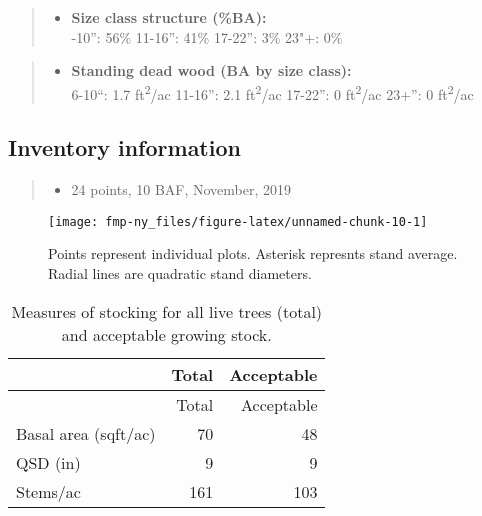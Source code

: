 \documentclass[]{tufte-handout}
\providecommand{\tightlist}{%
  \setlength{\itemsep}{0pt}\setlength{\parskip}{0pt}}
\begin{document}
\begin{quote}
\begin{itemize}
\tightlist
\item
  \textbf{Size class structure (\%BA):}\\
  \vspace{2pt} -10'': 56\% \textbar{} 11-16'': 41\% \textbar{}
  17-22'': 3\% \textbar{} 23"+: 0\%
\end{itemize}
\end{quote}

\begin{quote}
\begin{itemize}
\tightlist
\item
  \textbf{Standing dead wood (BA by size class):}\\
  \vspace{2pt} \indent \small 6-10``: 1.7 ft\textsuperscript{2}/ac
  \textbar{} 11-16'': 2.1 ft\textsuperscript{2}/ac \textbar{} 17-22'': 0
  ft\textsuperscript{2}/ac \textbar{} 23+'': 0 ft\textsuperscript{2}/ac
\end{itemize}
\end{quote}

\subsection{Inventory information}\label{inventory-information-1}

\begin{quote}
\begin{itemize}
\tightlist
\item
  24 points, 10 BAF, November, 2019
\end{itemize}
\end{quote}

\begin{figure}
\texttt{[image: fmp-ny\_files/figure-latex/unnamed-chunk-10-1]} \caption[Points represent individual plots]{Points represent individual plots. Asterisk represnts stand average. Radial lines are quadratic stand diameters.}\label{fig:unnamed-chunk-10}
\end{figure}

\begin{longtable}[]{@{}lrr@{}}
\caption{Measures of stocking for all live trees (total) and acceptable
growing stock.}\tabularnewline
\toprule
& Total & Acceptable\tabularnewline
\midrule
\endfirsthead
\toprule
& Total & Acceptable\tabularnewline
\midrule
\endhead
Basal area (sqft/ac) & 70 & 48\tabularnewline
QSD (in) & 9 & 9\tabularnewline
Stems/ac & 161 & 103\tabularnewline
\bottomrule
\end{longtable}
\end{document}

